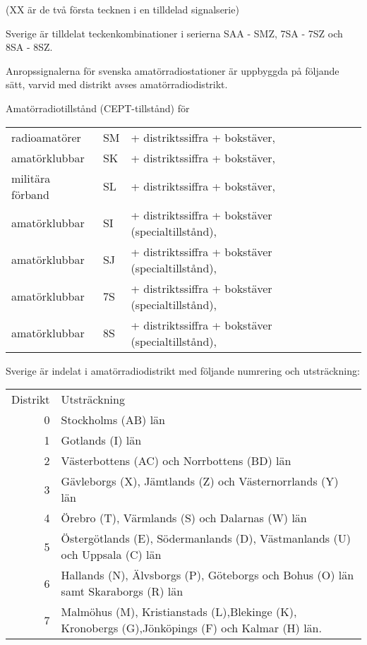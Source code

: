 (XX är de två första tecknen i en tilldelad signalserie)

Sverige är tilldelat teckenkombinationer i serierna SAA - SMZ, 7SA - 7SZ och
8SA - 8SZ.

Anropssignalerna för svenska amatörradiostationer är uppbyggda på följande
sätt, varvid med distrikt avses amatörradiodistrikt.

Amatörradiotillstånd (CEPT-tillstånd) för
\begin{tabular}{lll}
radioamatörer & SM & + distriktssiffra + bokstäver,  \\
amatörklubbar & SK & + distriktssiffra + bokstäver,  \\
militära förband & SL & + distriktssiffra + bokstäver, \\
amatörklubbar & SI & + distriktssiffra + bokstäver (specialtillstånd), \\
amatörklubbar & SJ & + distriktssiffra + bokstäver (specialtillstånd), \\
amatörklubbar & 7S & + distriktssiffra + bokstäver (specialtillstånd), \\
amatörklubbar & 8S & + distriktssiffra + bokstäver (specialtillstånd), \\
\end{tabular}

Sverige är indelat i amatörradiodistrikt med följande numrering och
utsträckning:

\begin{tabular}{rp{5cm}}
Distrikt & Utsträckning \\
0 & Stockholms (AB) län \\
1 & Gotlands (I) län \\
2 & Västerbottens (AC) och Norrbottens (BD) län \\
3 & Gävleborgs (X), Jämtlands (Z) och Västernorrlands (Y) län \\
4 & Örebro (T), Värmlands (S) och Dalarnas (W) län \\
5 & Östergötlands (E), Södermanlands (D), Västmanlands (U) och Uppsala (C) län\\
6 & Hallands (N), Älvsborgs (P), Göteborgs och Bohus (O) län samt Skaraborgs (R) län \\
7 & Malmöhus (M), Kristianstads (L),Blekinge (K), Kronobergs (G),Jönköpings (F) och Kalmar (H) län.\\
\end{tabular}

